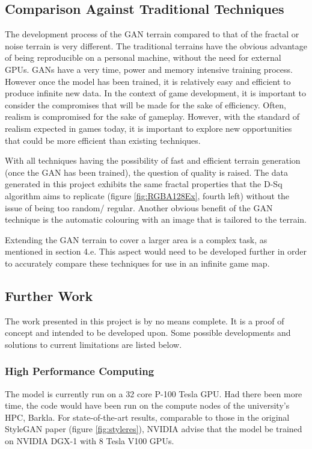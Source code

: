 \documentclass[a4paper]{report}
\begin{document}
\subsection{Comparison Against Traditional Techniques}
The development process of the GAN terrain compared to that of the fractal or noise terrain is very different. The traditional terrains have the obvious advantage of being reproducible on a personal machine, without the need for external GPUs. GANs have a very time, power and memory intensive training process. However once the model has been trained, it is relatively easy and efficient to produce infinite new data. In the context of game development, it is important to consider the compromises that will be made for the sake of efficiency. Often, realism is compromised for the sake of gameplay. However, with the standard of realism expected in games today, it is important to explore new opportunities that could be more efficient than existing techniques.

With all techniques having the possibility of fast and efficient terrain generation (once the GAN has been trained), the question of quality is raised. The data generated in this project exhibits the same fractal properties that the D-Sq algorithm aims to replicate (figure \ref{fig:RGBA128Ex}, fourth left) without the issue of being too random/ regular. Another obvious benefit of the GAN technique is the automatic colouring with an image that is tailored to the terrain.

Extending the GAN terrain to cover a larger area is a complex task, as mentioned in section 4.e. This aspect would need to be developed further in order to accurately compare these techniques for use in an infinite game map.

\subsection{Further Work}
The work presented in this project is by no means complete. It is a proof of concept and intended to be developed upon. Some possible developments and solutions to current limitations are listed below.

\subsubsection{High Performance Computing}
The model is currently run on a 32 core P-100 Tesla GPU. Had there been more time, the code would have been run on the compute nodes of the university's HPC, Barkla. For state-of-the-art results, comparable to those in the original StyleGAN paper (figure \ref{fig:styleres}), NVIDIA advise that the model be trained on NVIDIA DGX-1 with 8 Tesla V100 GPUs.
\end{document}
